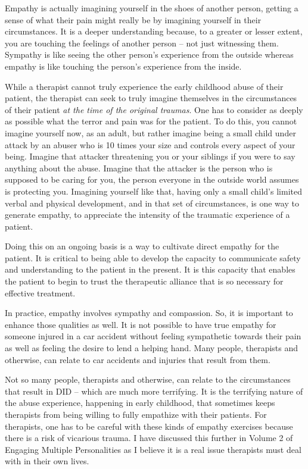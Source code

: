 \documentclass[]{book}
\begin{document}
Empathy is actually imagining yourself in the shoes of another person, getting a sense of what their pain might really be by imagining yourself in their circumstances. It is a deeper understanding because, to a greater or lesser extent, you are touching the feelings of another person -- not just witnessing them. Sympathy is like seeing the other person's experience from the outside whereas empathy is like touching the person's experience from the inside.

While a therapist cannot truly experience the early childhood abuse of their patient, the therapist can seek to truly imagine themselves in the circumstances of their patient \emph{at the time of the original traumas}. One has to consider as deeply as possible what the terror and pain was for the patient. To do this, you cannot imagine yourself now, as an adult, but rather imagine being a small child under attack by an abuser who is 10 times your size and controls every aspect of your being. Imagine that attacker threatening you or your siblings if you were to say anything about the abuse. Imagine that the attacker is the person who is supposed to be caring for you, the person everyone in the outside world assumes is protecting you. Imagining yourself like that, having only a small child's limited verbal and physical development, and in that set of circumstances, is one way to generate empathy, to appreciate the intensity of the traumatic experience of a patient.

Doing this on an ongoing basis is a way to cultivate direct empathy for the patient. It is critical to being able to develop the capacity to communicate safety and understanding to the patient in the present. It is this capacity that enables the patient to begin to trust the therapeutic alliance that is so necessary for effective treatment.

In practice, empathy involves sympathy and compassion. So, it is important to enhance those qualities as well. It is not possible to have true empathy for someone injured in a car accident without feeling sympathetic towards their pain as well as feeling the desire to lend a helping hand. Many people, therapists and otherwise, can relate to car accidents and injuries that result from them.

Not so many people, therapists and otherwise, can relate to the circumstances that result in DID -- which are much more terrifying. It is the terrifying nature of the abuse experience, happening in early childhood, that sometimes keeps therapists from being willing to fully empathize with their patients. For therapists, one has to be careful with these kinds of empathy exercises because there is a risk of vicarious trauma. I have discussed this further in Volume 2 of Engaging Multiple Personalities as I believe it is a real issue therapists must deal with in their own lives.
\end{document}
